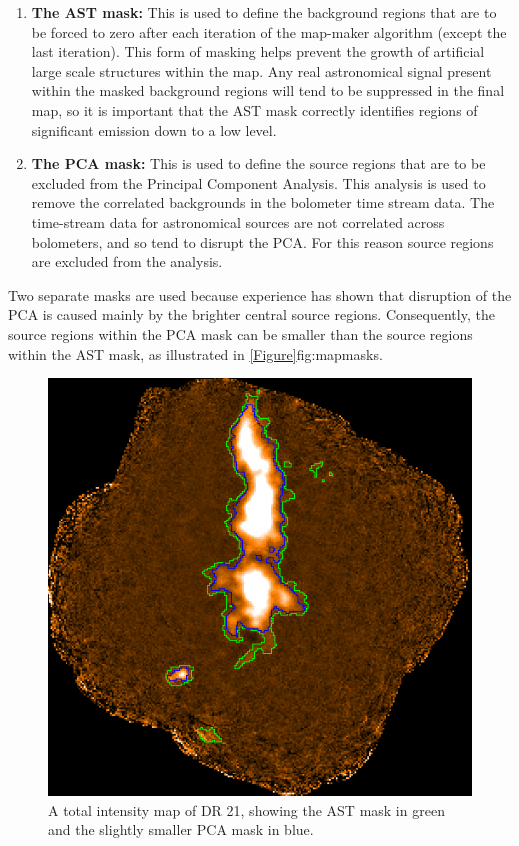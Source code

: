 \begin{enumerate}
\item {\bf The AST mask:} This is used to define the background regions that are to be forced to zero after each iteration of the map-maker algorithm (except the last iteration). This form of masking helps prevent the growth of artificial large scale structures within the map. Any real astronomical signal present within the masked background regions will tend to be suppressed in the final map, so it is important that the AST mask correctly identifies regions of significant emission down to a low level.
\item {\bf The PCA mask:} This is used to define the source regions that are to be excluded from the Principal Component Analysis. This analysis is used to remove the correlated backgrounds in the bolometer time stream data. The time-stream data for astronomical sources are not correlated across bolometers, and so tend to disrupt the PCA. For this reason source regions are excluded from the analysis.
\end{enumerate}

Two separate masks are used because experience has shown that disruption of the PCA is caused mainly by the brighter central source regions. Consequently, the source regions within the PCA mask can  be smaller than the source regions within the AST mask, as illustrated in \cref{Figure}{fig:mapmasks}{}.

\begin{figure}[ht!]
\begin{center}
\includegraphics[width=0.46\linewidth]{sc-22-map-masks-1.png}
\caption [Example POL-2 map of DR21, showing the difference between the two \poltwomap\ masks.]{A total intensity map of DR 21, showing the AST mask in green and the slightly smaller PCA mask in blue.
\label{fig:mapmasks}
}
\end{center}
\end{figure}

